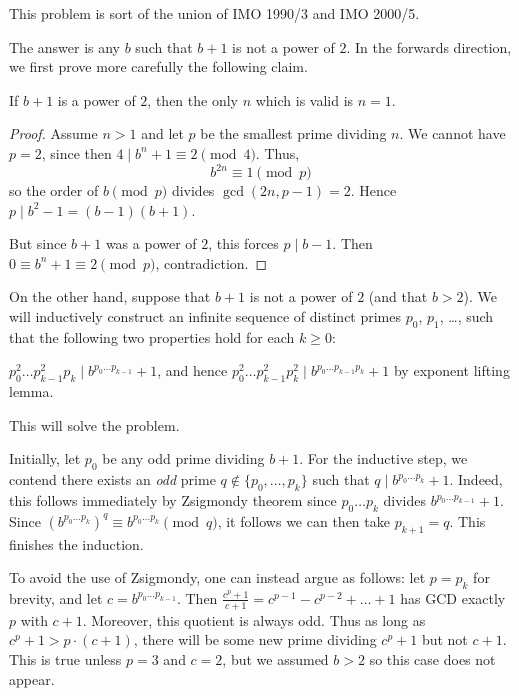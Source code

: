 \documentclass[11pt,twoside]{scrartcl}
\begin{document}
\begin{soln}
    This problem is sort of the union of IMO 1990/3 and IMO 2000/5.

    The answer is any $b$ such that $b+1$ is not a power of $2$.
    In the forwards direction, we first prove more carefully the
    following claim.
    
    \begin{claim*}
        If $b+1$ is a power of $2$,
        then the only $n$ which is valid is $n = 1$.
    \end{claim*}
    \begin{proof}
        Assume $n > 1$ and let $p$ be the smallest prime dividing $n$.
        We cannot have $p=2$, since then $4 \mid b^n+1 \equiv 2 \pmod 4$.
        Thus, \[ b^{2n} \equiv 1 \pmod p \]
        so the order of $b \pmod p$ divides $\gcd(2n,p-1) = 2$.
        Hence $p \mid b^2-1 = (b-1)(b+1)$.
    
        But since $b+1$ was a power of $2$,
        this forces $p \mid b-1$.
        Then $0 \equiv b^n + 1 \equiv 2 \pmod p$, contradiction.
    \end{proof}
    
    On the other hand, suppose that $b+1$ is not a power of $2$
    (and that $b > 2$).
    We will inductively construct an infinite sequence
    of distinct primes $p_0$, $p_1$, \dots,
    such that the following two properties hold for each $k \ge 0$:
    \begin{itemize}
        \ii $p_0^2 \dots p_{k-1}^2 p_k \mid b^{p_0 \dots p_{k-1}} + 1$,
        \ii and hence $p_0^2 \dots p_{k-1}^2 p_k^2 \mid b^{p_0 \dots p_{k-1} p_k} + 1$
        by exponent lifting lemma.
    \end{itemize}
    This will solve the problem.
    
    Initially, let $p_0$ be any odd prime dividing $b+1$.
    For the inductive step, we contend there exists an
    \emph{odd} prime $q \notin \{p_0, \dots, p_k\}$
    such that $q \mid b^{p_0 \dots p_k} + 1$.
    Indeed, this follows immediately by Zsigmondy theorem
    since $p_0 \dots p_k$ divides $b^{p_0 \dots p_{k-1}} + 1$.
    Since $(b^{p_0 \dots p_k})^q \equiv b^{p_0 \dots p_k} \pmod q$,
    it follows we can then take $p_{k+1} = q$.
    This finishes the induction.
    
    To avoid the use of Zsigmondy,
    one can instead argue as follows:
    let $p = p_k$ for brevity, and let $c = b^{p_0 \dots p_{k-1}}$.
    Then $\frac{c^p+1}{c+1} = c^{p-1} - c^{p-2} + \dots + 1$
    has GCD exactly $p$ with $c+1$.
    Moreover, this quotient is always odd.
    Thus as long as $c^p + 1 > p \cdot (c+1)$,
    there will be some new prime dividing $c^p+1$ but not $c+1$.
    This is true unless $p = 3$ and $c = 2$,
    but we assumed $b > 2$ so this case does not appear.
    
    
\end{soln}
\end{document}
